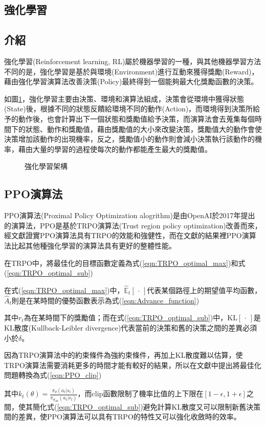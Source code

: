 \documentclass[a4paper, onecolumn, 11pt, AutoFakeBold]{article}
\newcommand{\figref}[1]{圖\ref{#1}}
\renewcommand{\eqref}[1]{式(\ref{#1})}
\begin{document}
\begin{multicols*}{2}
\smallskip
\section{強化學習}
\subsection{介紹}
\par
強化學習(Reinforcement learning, RL)屬於機器學習的一種，與其他機器學習方法不同的是，強化學習是基於與環境(Environment)進行互動來獲得獎勵(Reward)，藉由強化學習演算法改善決策(Policy)最終得到一個能夠最大化獎勵函數的決策。
\par
如\figref{fig:RL_architecture}，強化學習主要由決策、環境和演算法組成，決策會從環境中獲得狀態(State)後，根據不同的狀態反饋給環境不同的動作(Action)，而環境得到決策所給予的動作後，也會計算出下一個狀態和獎勵值給予決策，而演算法會去蒐集每個時間下的狀態、動作和獎勵值，藉由獎勵值的大小來改變決策，獎勵值大的動作會使決策增加該動作的出現機率，反之，獎勵值小的動作則會減小決策執行該動作的機率，藉由大量的學習的過程使每次的動作都能產生最大的獎勵值。
\begin{figure}[H]
    \centering
    
    \caption{強化學習架構}
    \label{fig:RL_architecture}
\end{figure}

\smallskip
\subsection{PPO演算法}
\par
PPO演算法(Proximal Policy Optimization alogrithm)是由OpenAI於2017年提出的演算法，PPO是基於TRPO演算法(Trust region policy optimization)改善而來，經文獻\cite{PPO_algorithms}證實PPO演算法具有TRPO的效能和強健性，而在文獻\cite{PPO_algorithms}的結果裡PPO演算法比起其他種強化學習的演算法具有更好的整體性能。
\par
在TRPO中，將最佳化的目標函數定義為\eqref{eqn:TRPO_optimal_max}和\eqref{eqn:TRPO_optimal_sub}

\noindent 在\eqref{eqn:TRPO_optimal_max}中，$\hat{\mathbb{E}}_t[\,\cdot\,]$代表某個路徑上的期望值平均函數，$\hat{A}_t$則是在某時間的優勢函數表示為\eqref{eqn:Advance_function}

\noindent 其中$r_t$為在某時間下的獎勵值；而在\eqref{eqn:TRPO_optimal_sub}中，$\text{KL}[\,\cdot\,]$是KL散度(Kullback-Leibler divergence)代表當前的決策和舊的決策之間的差異必須小於$\delta$。
\par
因為TRPO演算法中的約束條件為強約束條件，再加上KL散度難以估算，使TRPO演算法需要消耗更多的時間才能有較好的結果，所以在文獻\cite{PPO_algorithms}中提出將最佳化問題轉換為\eqref{eqn:PPO_clip}

\noindent 其中$k_t(\theta)=\frac{\pi_{\theta}(a_t|s_t)}{\pi_{\theta_\text{old}}(a_t|s_t)}$，而clip函數限制了機率比值的上下限在$\left[1-\epsilon, 1+\epsilon\right]$之間，使其簡化\eqref{eqn:TRPO_optimal_sub}避免計算KL散度又可以限制新舊決策間的差異，使PPO演算法可以具有TRPO的特性又可以強化收斂時的效率。


\end{multicols*}
\end{document}
